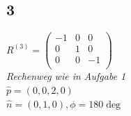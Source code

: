 \documentclass{../Vorlage/mat}
\begin{document}
\subsection*{3}
$R^{(3)} = \begin{pmatrix}
-1 & 0 & 0 \\
0 & 1 & 0\\
0 & 0 & -1\\
\end{pmatrix}
$\\
\textit{Rechenweg wie in Aufgabe 1}\\
$\hat{p} = \left(0,0,2,0\right)$\\
$\hat{n} =(0,1,0) , \phi = 180\deg$
\end{document}
